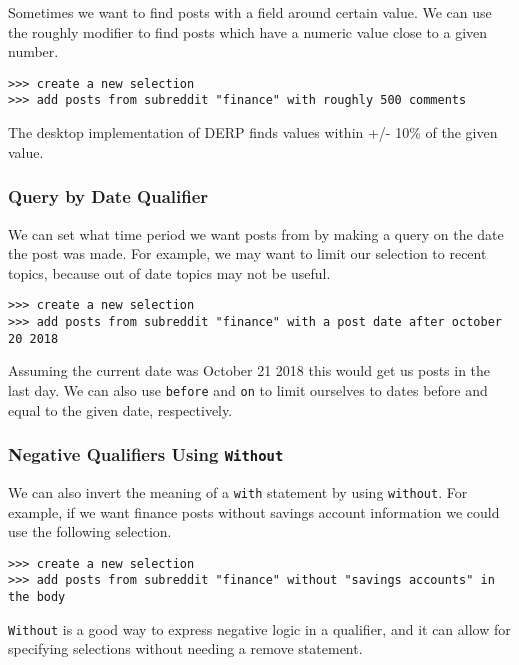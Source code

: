 Sometimes we want to find posts with a field around certain value. We can use the roughly modifier to find posts which have a numeric value close to a given number.
\newline\begin{minipage}{\linewidth}\begin{lstlisting}
>>> create a new selection
>>> add posts from subreddit "finance" with roughly 500 comments
\end{lstlisting}\end{minipage}
The desktop implementation of DERP finds values within +/- 10\% of the given value.


\subsubsection{Query by Date Qualifier}
We can set what time period we want posts from by making a query on the date the post was made. For example, we may want to limit our selection to recent topics, because out of date topics may not be useful.
\newline\begin{minipage}{\linewidth}\begin{lstlisting}
>>> create a new selection
>>> add posts from subreddit "finance" with a post date after october 20 2018
\end{lstlisting}\end{minipage}
Assuming the current date was October 21 2018 this would get us posts in the last day. We can also use \texttt{before} and \texttt{on} to limit ourselves to dates before and equal to the given date, respectively.



\subsubsection{Negative Qualifiers Using \texttt{Without}}
We can also invert the meaning of a \texttt{with} statement by using \texttt{without}. For example, if we want finance posts without savings account information we could use the following selection.
\newline\begin{minipage}{\linewidth}\begin{lstlisting}
>>> create a new selection
>>> add posts from subreddit "finance" without "savings accounts" in the body
\end{lstlisting}\end{minipage}
\texttt{Without} is a good way to express negative logic in a qualifier, and it can allow for specifying selections without needing a remove statement.


